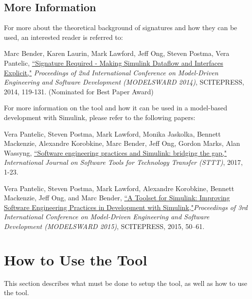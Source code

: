 \documentclass{article}
\begin{document}
\subsection*{More Information}
For more about the theoretical background of signatures and how they can be used, an interested reader is referred to:

Marc Bender, Karen Laurin, Mark Lawford, Jeff Ong, Steven Postma, Vera Pantelic, \href{http://www.cas.mcmaster.ca/~lawford/papers/MODELSWARD2014.pdf}{``Signature Required - Making Simulink Dataflow and Interfaces Explicit,"} \textit{Proceedings of 2nd International Conference on Model-Driven Engineering and Software Development (MODELSWARD 2014)}, SCITEPRESS, 2014, 119-131. (Nominated for Best Paper Award)

\vspace{1em}
For more information on the tool and how it can be used in a model-based development with Simulink, please refer to the following papers:

\vspace{1em}
Vera Pantelic, Steven Postma, Mark Lawford, Monika Jaskolka, Bennett Mackenzie, Alexandre Korobkine, Marc Bender, Jeff Ong, Gordon Marks, Alan Wassyng, \href{https://link.springer.com/article/10.1007/s10009-017-0450-9}{``Software engineering practices and Simulink: bridging the gap,"} \textit{International Journal on Software Tools for Technology Transfer (STTT)}, 2017, 1-23.

\vspace{1em}
Vera Pantelic, Steven Postma, Mark Lawford, Alexandre Korobkine, Bennett Mackenzie, Jeff Ong, and Marc Bender, \href{http://www.cas.mcmaster.ca/~lawford/papers/MODELSWARD2015.pdf}{``A Toolset for Simulink: Improving Software Engineering Practices in Development with Simulink,"}\textit{Proceedings of 3rd International Conference on Model-Driven Engineering and Software Development (MODELSWARD 2015)}, SCITEPRESS, 2015, 50--61.

\newpage	
\section{How to Use the Tool}
This section describes what must be done to setup the tool, as well as how to use the tool.

\end{document}
